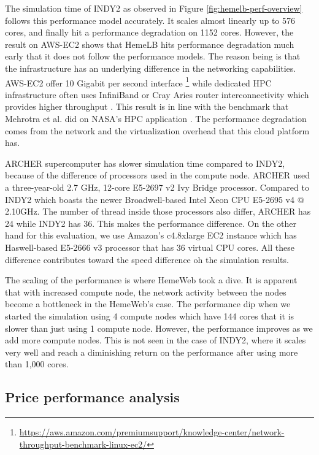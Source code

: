 The simulation time of INDY2 as observed in Figure \ref{fig:hemelb-perf-overview} follows this performance model accurately. It scales almost linearly up to 576 cores, and finally hit a performance degradation on 1152 cores. However, the result on AWS-EC2 shows that HemeLB hits performance degradation much early that it does not follow the performance models. The reason being is that the infrastructure has an underlying difference in the networking capabilities. AWS-EC2 offer 10 Gigabit per second interface \footnote{\url{https://aws.amazon.com/premiumsupport/knowledge-center/network-throughput-benchmark-linux-ec2/}} while dedicated HPC infrastructure often uses InfiniBand or Cray Aries router interconnectivity which provides higher throughput \cite{Quan:2014aa}. This result is in line with the benchmark that Mehrotra et al. did on NASA's HPC application \citep{mehrotra2012performance}. The performance degradation comes from the network and the virtualization overhead that this cloud platform has. 


ARCHER supercomputer has slower simulation time compared to INDY2, because of the difference of processors used in the compute node. ARCHER used a three-year-old 2.7 GHz, 12-core E5-2697 v2 Ivy Bridge processor. Compared to INDY2 which boasts the newer Broadwell-based Intel Xeon CPU E5-2695 v4 @ 2.10GHz. The number of thread inside those processors also differ, ARCHER has 24 while INDY2 has 36. This makes the performance difference. On the other hand for this evaluation, we use Amazon's c4.8xlarge EC2 instance which has Haswell-based E5-2666 v3 processor that has 36 virtual CPU cores. All these difference contributes toward the speed difference oh the simulation results.

The scaling of the performance is where HemeWeb took a dive. It is apparent that with increased compute node, the network activity between the nodes become a bottleneck in the HemeWeb's case. The performance dip when we started the simulation using 4 compute nodes which have 144 cores that it is slower than just using 1 compute node. However, the performance improves as we add more compute nodes. This is not seen in the case of INDY2, where it scales very well and reach a diminishing return on the performance after using more than 1,000 cores.

\subsection{Price performance analysis}

